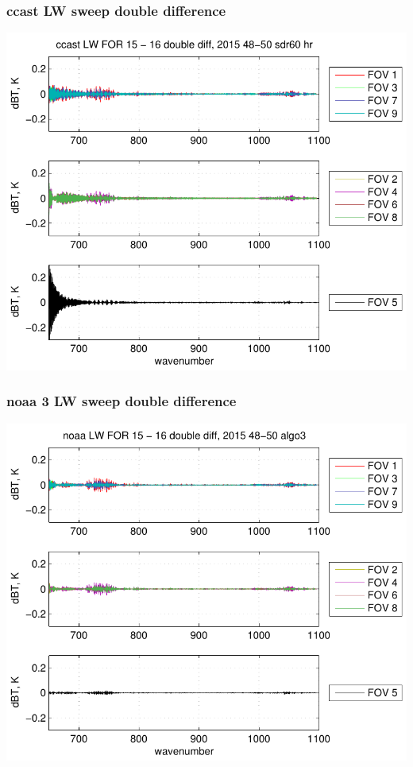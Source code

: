 \documentclass[11pt]{beamer}
\begin{document}
\begin{frame}
\frametitle{ccast LW sweep double difference}
\begin{center}
  \includegraphics[scale=0.7]{figures/ccast_LW_sfil_2015_48-50_sdr60_hr.pdf}
\end{center}
\end{frame}
\begin{frame}
\frametitle{noaa 3 LW sweep double difference}
\begin{center}
  \includegraphics[scale=0.7]{figures/noaa_LW_sfil_2015_48-50_algo3.pdf}
\end{center}
\end{frame}
\end{document}
